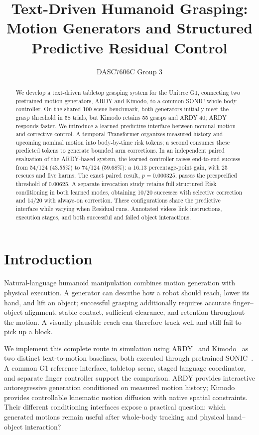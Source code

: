 \documentclass[letterpaper,10pt,conference]{ieeeconf}
\title{\LARGE \bfseries Text-Driven Humanoid Grasping:\\Motion Generators and Structured Predictive Residual Control}
\author{DASC7606C Group 3}
\begin{document}
\maketitle
\thispagestyle{empty}
\pagestyle{empty}

\begin{abstract}
We develop a text-driven tabletop grasping system for the Unitree G1, connecting two pretrained motion generators, ARDY and Kimodo, to a common SONIC whole-body controller. On the shared 100-scene benchmark, both generators initially meet the grasp threshold in 58 trials, but Kimodo retains 55 grasps and ARDY 40; ARDY responds faster. We introduce a learned predictive interface between nominal motion and corrective control. A temporal Transformer organizes measured history and upcoming nominal motion into body-by-time risk tokens; a second consumes these predicted tokens to generate bounded arm corrections. In an independent paired evaluation of the ARDY-based system, the learned controller raises end-to-end success from 54/124 (43.55\%) to 74/124 (59.68\%): a 16.13 percentage-point gain, with 25 rescues and five harms. The exact paired result, $p=0.000325$, passes the prespecified threshold of 0.00625. A separate invocation study retains full structured Risk conditioning in both learned modes, obtaining 10/20 successes with selective correction and 14/20 with always-on correction. These configurations share the predictive interface while varying when Residual runs. Annotated videos link instructions, execution stages, and both successful and failed object interactions.
\end{abstract}

\section{Introduction}
Natural-language humanoid manipulation combines motion generation with physical execution. A generator can describe how a robot should reach, lower its hand, and lift an object; successful grasping additionally requires accurate finger--object alignment, stable contact, sufficient clearance, and retention throughout the motion. A visually plausible reach can therefore track well and still fail to pick up a block.

We implement this complete route in simulation using ARDY~\cite{ardy} and Kimodo~\cite{kimodo} as two distinct text-to-motion baselines, both executed through pretrained SONIC~\cite{sonic}. A common G1 reference interface, tabletop scene, staged language coordinator, and separate finger controller support the comparison. ARDY provides interactive autoregressive generation conditioned on measured motion history; Kimodo provides controllable kinematic motion diffusion with native spatial constraints. Their different conditioning interfaces expose a practical question: which generated motions remain useful after whole-body tracking and physical hand--object interaction?
\end{document}
